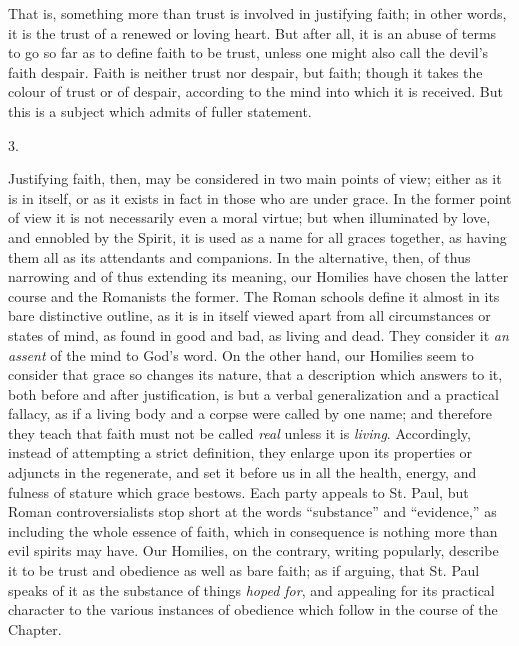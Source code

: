 That is, something more than trust is involved in justifying faith; in
other words, it is the trust of a renewed or loving heart. But after
all, it is an abuse of terms to go so far as to define faith to be
trust, unless one might also call the devil's faith despair.
Faith is neither trust nor despair, but faith; though it takes the
colour of trust or of despair, according to the mind into which it is
received. But this is a subject which admits of fuller statement.

3.

Justifying faith, then, may be considered in two main points of
view; either as it is in itself, or as it exists in fact in those who
are under grace. In the former point of view it is not necessarily
even a moral virtue; but when illuminated by love, and ennobled by the
Spirit, it is used as a name for all graces together, as having them
all as its attendants and companions. In the alternative, then, of
thus narrowing and of thus extending its meaning, our Homilies have
chosen the latter course and the Romanists the former. The Roman
schools define it almost in its bare distinctive outline, as it is in
itself viewed apart from all circumstances or states of mind, as found
in good and bad, as living and dead. They consider it \emph{an assent}
of the mind to God's word. On the other hand, our Homilies seem to
consider that grace so changes its nature, that a description which
answers to it, both before and after justification, is but a verbal
generalization and a practical fallacy, as if a living body and a
corpse were called by one name; and therefore they teach that faith
must not be called \emph{real} unless it is \emph{living}.
Accordingly, instead of attempting a strict definition, they enlarge
upon its properties or adjuncts in the regenerate, and set it before
us in all the health, energy, and fulness of stature which grace
bestows. Each party appeals to St. Paul, but Roman
controversialists stop short at the words ``substance'' and
``evidence,'' as including the whole essence of faith, which
in consequence is nothing more than evil spirits may have. Our
Homilies, on the contrary, writing popularly, describe it to be trust
and obedience as well as bare faith; as if arguing, that St. Paul
speaks of it as the substance of things \emph{hoped for}, and
appealing for its practical character to the various instances of
obedience which follow in the course of the Chapter.

